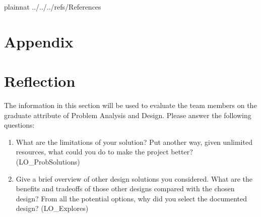 \documentclass[12pt, titlepage]{article}
\begin{document}

 {plainnat}
 {../../../refs/References}

\newpage

\section{Appendix} \label{Appendix}


\section{Reflection}

The information in this section will be used to evaluate the team members on the
graduate attribute of Problem Analysis and Design.  Please answer the following questions:

\begin{enumerate}
  \item What are the limitations of your solution?  Put another way, given
  unlimited resources, what could you do to make the project better? (LO\_ProbSolutions)
  \item Give a brief overview of other design solutions you considered.  What
  are the benefits and tradeoffs of those other designs compared with the chosen
  design?  From all the potential options, why did you select the documented design?
  (LO\_Explores)
\end{enumerate}
\end{document}
